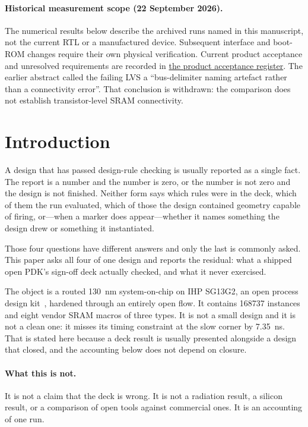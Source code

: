 \documentclass[11pt,a4paper]{article}
\begin{document}
\paragraph{Historical measurement scope (22 September 2026).}
The numerical results below describe the archived runs named in this
manuscript, not the current RTL or a manufactured device. Subsequent
interface and boot-ROM changes require their own physical verification.
Current product acceptance and unresolved requirements are recorded in
\href{https://github.com/Melihakbulut221/nssoc/blob/codex/complete-open-work/docs/92-product-acceptance.md}{the product acceptance register}.
The earlier abstract called the failing LVS a ``bus-delimiter naming
artefact rather than a connectivity error''. That conclusion is withdrawn:
the comparison does not establish transistor-level SRAM connectivity.


\section{Introduction}
\label{sec:intro}

A design that has passed design-rule checking is usually reported as a
single fact. The report is a number and the number is zero, or the
number is not zero and the design is not finished. Neither form says
which rules were in the deck, which of them the run evaluated, which of
those the design contained geometry capable of firing, or---when a
marker does appear---whether it names something the design drew or
something it instantiated.

Those four questions have different answers and only the last is
commonly asked. This paper asks all four of one design and reports the
residual: what a shipped open PDK's sign-off deck actually checked, and
what it never exercised.

The object is a routed \SI{130}{\nano\meter} system-on-chip on IHP
SG13G2, an open process design kit~\cite{ihppdk}, hardened through an entirely open
flow. It contains \num{168737} instances and eight vendor SRAM macros of
three types. It is not a small design and it is not a clean one: it
misses its timing constraint at the slow corner by
\SI{7.35}{\nano\second}. That is stated here because a deck result is
usually presented alongside a design that closed, and the accounting
below does not depend on closure.

\paragraph{What this is not.} It is not a claim that the deck is wrong.
It is not a radiation result, a silicon result, or a comparison of open
tools against commercial ones. It is an accounting of one run.
\end{document}
